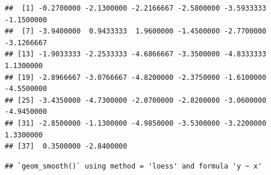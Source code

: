 \documentclass[]{article}
\newenvironment{Shaded}{\begin{snugshade}}{\end{snugshade}}
\newcommand{\KeywordTok}[1]{\textcolor[rgb]{0.13,0.29,0.53}{\textbf{#1}}}
\newcommand{\DataTypeTok}[1]{\textcolor[rgb]{0.13,0.29,0.53}{#1}}
\newcommand{\DecValTok}[1]{\textcolor[rgb]{0.00,0.00,0.81}{#1}}
\newcommand{\StringTok}[1]{\textcolor[rgb]{0.31,0.60,0.02}{#1}}
\newcommand{\OperatorTok}[1]{\textcolor[rgb]{0.81,0.36,0.00}{\textbf{#1}}}
\newcommand{\NormalTok}[1]{#1}
\begin{document}
\begin{Shaded}
\end{Shaded}

\begin{verbatim}
##  [1] -0.2700000 -2.1300000 -2.2166667 -2.5800000 -3.5933333 -1.1500000
##  [7] -3.9400000  0.9433333  1.9600000 -1.4500000 -2.7700000 -3.1266667
## [13] -1.9033333 -2.2533333 -4.6866667 -3.3500000 -4.8333333  1.1300000
## [19] -2.8966667 -3.0766667 -4.8200000 -2.3750000 -1.6100000 -4.5500000
## [25] -3.4350000 -4.7300000 -2.0700000 -2.8200000 -3.0600000 -4.9450000
## [31] -2.8500000 -1.1300000 -4.9850000 -3.5300000 -3.2200000  1.3300000
## [37]  0.3500000 -2.8400000
\end{verbatim}

\begin{Shaded}
\end{Shaded}

\begin{verbatim}
## `geom_smooth()` using method = 'loess' and formula 'y ~ x'
\end{verbatim}
\end{document}
